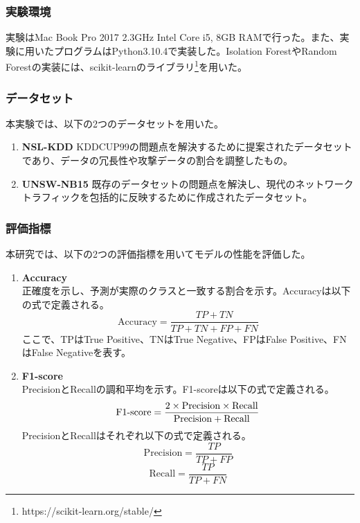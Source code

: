 \documentclass{css}
\begin{document}
\subsubsection{実験環境}

実験はMac Book Pro 2017 2.3GHz Intel Core i5, 8GB RAMで行った。また、実験に用いたプログラムはPython3.10.4で実装した。Isolation ForestやRandom Forestの実装には、scikit-learnのライブラリ\footnote[1]{https://scikit-learn.org/stable/}を用いた。

\subsubsection{データセット}
本実験では、以下の2つのデータセットを用いた。

\begin{enumerate}
    \item \textbf{NSL-KDD}
        KDDCUP99の問題点を解決するために提案されたデータセットであり、データの冗長性や攻撃データの割合を調整したもの。
    \item \textbf{UNSW-NB15}
        既存のデータセットの問題点を解決し、現代のネットワークトラフィックを包括的に反映するために作成されたデータセット。
\end{enumerate}


\subsubsection{評価指標}
本研究では、以下の2つの評価指標を用いてモデルの性能を評価した。

\begin{enumerate}
    \item \textbf{Accuracy}\\
        正確度を示し、予測が実際のクラスと一致する割合を示す。Accuracyは以下の式で定義される。
        \begin{equation}
            \mathrm{Accuracy} = \frac{TP + TN}{TP + TN + FP + FN}
        \end{equation}
        ここで、TPはTrue Positive、TNはTrue Negative、FPはFalse Positive、FNはFalse Negativeを表す。
    
    \item \textbf{F1-score}\\
        PrecisionとRecallの調和平均を示す。F1-scoreは以下の式で定義される。
        \begin{equation}
            \mathrm{F1\mathchar`-score} = \frac{2 \times \mathrm{Precision} \times \mathrm{Recall}}{\mathrm{Precision} + \mathrm{Recall}}
        \end{equation}
        PrecisionとRecallはそれぞれ以下の式で定義される。
        \begin{equation}
            \mathrm{Precision} = \frac{TP}{TP + FP}
        \end{equation}
        \begin{equation}
            \mathrm{Recall} = \frac{TP}{TP + FN}
        \end{equation}
\end{enumerate}
\end{document}

